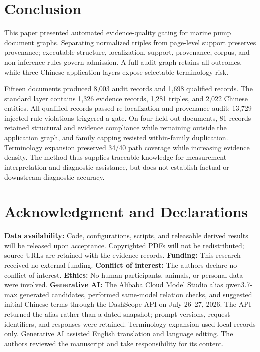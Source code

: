 \documentclass[conference,a4paper]{IEEEtran}
\begin{document}
\section{Conclusion}

This paper presented automated evidence-quality gating for marine pump document graphs. Separating normalized triples from page-level support preserves provenance; executable structure, localization, support, provenance, corpus, and non-inference rules govern admission. A full audit graph retains all outcomes, while three Chinese application layers expose selectable terminology risk.

Fifteen documents produced 8,003 audit records and 1,698 qualified records. The standard layer contains 1,326 evidence records, 1,281 triples, and 2,022 Chinese entities. All qualified records passed re-localization and provenance audit; 13,729 injected rule violations triggered a gate. On four held-out documents, 81 records retained structural and evidence compliance while remaining outside the application graph, and family capping resisted within-family duplication. Terminology expansion preserved 34/40 path coverage while increasing evidence density. The method thus supplies traceable knowledge for measurement interpretation and diagnostic assistance, but does not establish factual or downstream diagnostic accuracy.

\section*{Acknowledgment and Declarations}

\textbf{Data availability:} Code, configurations, scripts, and releasable derived results will be released upon acceptance. Copyrighted PDFs will not be redistributed; source URLs are retained with the evidence records. \textbf{Funding:} This research received no external funding. \textbf{Conflict of interest:} The authors declare no conflict of interest. \textbf{Ethics:} No human participants, animals, or personal data were involved. \textbf{Generative AI:} The Alibaba Cloud Model Studio alias \mbox{qwen3.7-max} generated candidates, performed same-model relation checks, and suggested initial Chinese terms through the DashScope API on July 26--27, 2026. The API returned the alias rather than a dated snapshot; prompt versions, request identifiers, and responses were retained. Terminology expansion used local records only. Generative AI assisted English translation and language editing. The authors reviewed the manuscript and take responsibility for its content.



\end{document}
